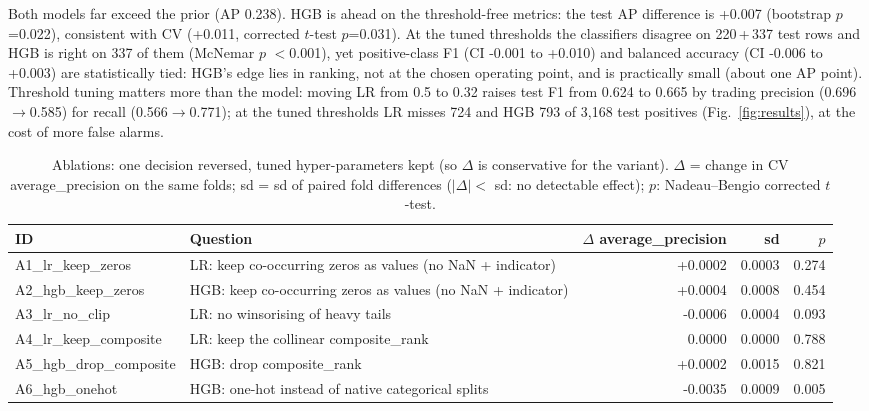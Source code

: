 \documentclass[10pt]{article}
\begin{document}
Both models far exceed the prior (AP 0.238). HGB is ahead on the threshold-free metrics: the test AP difference is +0.007 (bootstrap $p$=0.022), consistent with CV (+0.011, corrected $t$-test $p$=0.031). At the tuned thresholds the classifiers disagree on 220\,+\,337 test rows and HGB is right on 337 of them (McNemar $p$ $<$0.001), yet positive-class F1 (CI -0.001 to +0.010) and balanced accuracy (CI -0.006 to +0.003) are statistically tied: HGB's edge lies in ranking, not at the chosen operating point, and is practically small (about one AP point). Threshold tuning matters more than the model: moving LR from 0.5 to 0.32 raises test F1 from 0.624 to 0.665 by trading precision (0.696$\to$0.585) for recall (0.566$\to$0.771); at the tuned thresholds LR misses 724 and HGB 793 of 3{,}168 test positives (Fig.~\ref{fig:results}), at the cost of more false alarms.
\begin{table}[!htb]\centering\footnotesize\setlength{\tabcolsep}{3pt}
\caption{Ablations: one decision reversed, tuned hyper-parameters kept (so $\Delta$ is conservative for the variant). $\Delta$ = change in CV average\_precision on the same folds; sd = sd of paired fold differences ($|\Delta|<$ sd: no detectable effect); $p$: Nadeau--Bengio corrected $t$-test.}\label{tab:ablation}
\begin{tabularx}{\linewidth}{l Y r r r}\toprule
ID & Question & $\Delta$ average\_precision & sd & $p$\\\midrule
A1\_lr\_keep\_zeros & LR: keep co-occurring zeros as values (no NaN + indicator) & +0.0002 & 0.0003 & 0.274\\
A2\_hgb\_keep\_zeros & HGB: keep co-occurring zeros as values (no NaN + indicator) & +0.0004 & 0.0008 & 0.454\\
A3\_lr\_no\_clip & LR: no winsorising of heavy tails & -0.0006 & 0.0004 & 0.093\\
A4\_lr\_keep\_composite & LR: keep the collinear composite\_rank & 0.0000 & 0.0000 & 0.788\\
A5\_hgb\_drop\_composite & HGB: drop composite\_rank & +0.0002 & 0.0015 & 0.821\\
A6\_hgb\_onehot & HGB: one-hot instead of native categorical splits & -0.0035 & 0.0009 & 0.005\\
\bottomrule\end{tabularx}\end{table}
\end{document}
